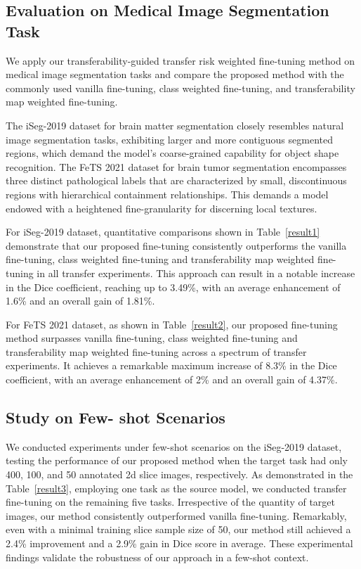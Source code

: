 \subsection{Evaluation on Medical Image Segmentation Task}
We apply our transferability-guided transfer risk weighted fine-tuning method on medical image segmentation tasks and compare the proposed method with the commonly used vanilla fine-tuning, class weighted fine-tuning\cite{class-weight}, and transferability map weighted fine-tuning\cite{10222912}. 

The iSeg-2019 dataset for brain matter segmentation closely resembles natural image segmentation tasks, exhibiting larger and more contiguous segmented regions, which demand the model's coarse-grained capability for object shape recognition. The FeTS 2021 dataset for brain tumor segmentation encompasses three distinct pathological labels that are characterized by small, discontinuous regions with hierarchical containment relationships. This demands a model endowed with a heightened fine-granularity for discerning local textures.

For iSeg-2019 dataset, quantitative comparisons shown in Table~\ref{result1} demonstrate that our proposed fine-tuning consistently outperforms the vanilla fine-tuning, class weighted fine-tuning and transferability map weighted fine-tuning in all transfer experiments. This approach can result in a notable increase in the Dice coefficient, reaching up to 3.49\%, with an average enhancement of 1.6\% and an overall gain of 1.81\%. 

For FeTS 2021 dataset, as shown in Table~\ref{result2}, our proposed fine-tuning method surpasses vanilla fine-tuning, class weighted fine-tuning and transferability map weighted fine-tuning across a spectrum of transfer experiments. It achieves a remarkable maximum increase of 8.3\% in the Dice coefficient, with an average enhancement of 2\% and an overall gain of 4.37\%.


\subsection{Study on Few- shot Scenarios}
We conducted experiments under few-shot scenarios on the iSeg-2019 dataset, testing the performance of our proposed method when the target task had only 400, 100, and 50 annotated 2d slice images, respectively. As demonstrated in the Table~\ref{result3}, employing one task as the source model, we conducted transfer fine-tuning on the remaining five tasks. Irrespective of the quantity of target images, our method consistently outperformed vanilla fine-tuning. Remarkably, even with a minimal training slice sample size of 50, our method still achieved a 2.4\% improvement and a 2.9\% gain in Dice score in average. These experimental findings validate the robustness of our approach in a few-shot context. %
